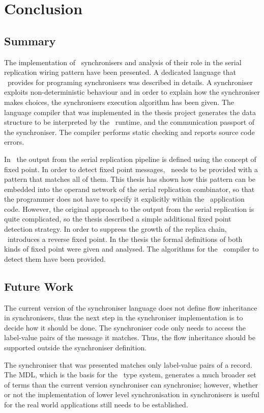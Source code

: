 \chapter{Conclusion} \label{concl}
    \section{Summary}
The implementation of \ak\ synchronisers and analysis of their role in the serial replication wiring pattern have been presented. A dedicated language that \ak\ provides for programing synchronisers was described in details. A synchroniser exploits non-deterministic behaviour and in order to explain how the synchroniser makes choices, the synchronisers execution algorithm has been given. The language compiler that was implemented in the thesis project generates the data structure to be interpreted by the \ak\ runtime, and the communication passport of the synchroniser. The compiler performs static checking and reports source code errors.

In \ak\ the output from the serial replication pipeline is defined using the concept of fixed point. In order to detect fixed point messages, \ak\ needs to be provided with a pattern that matches all of them. This thesis has shown how this pattern can be embedded into the operand network of the serial replication combinator, so that the programmer does not have to specify it explicitly within the \ak\ application code. However, the original approach to the output from the serial replication is quite complicated, so the thesis described a simple additional fixed point detection strategy. In order to suppress the growth of the replica chain, \ak\ introduces a reverse fixed point. In the thesis the formal definitions of both kinds of fixed point were given and analysed. The algorithms for the \ak\ compiler to detect them have been provided.


    \section{Future Work}
The current version of the synchroniser language does not define flow inheritance in synchronisers, thus the next step in the synchroniser implementation is to decide how it should be done. The synchroniser code only needs to access the label-value pairs of the message it matches. Thus, the flow inheritance should be supported outside the synchroniser definition.

The synchroniser that was presented matches only label-value pairs of a record. The MDL, which is the basis for the \ak\ type system, generates a much broader set of terms than the current version synchroniser can synchronise; however, whether or not the implementation of lower level synchronisation in synchronisers is useful for the real world applications still needs to be established.

